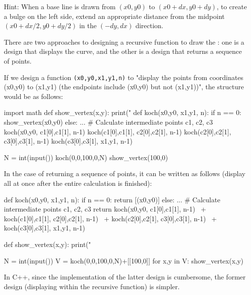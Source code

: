 Hint: When a base line is drawn from $(x0,y0)$ to $(x0+dx,y0+dy)$, to create a bulge on the left side, extend an appropriate distance from the midpoint $(x0+dx/2,y0+dy/2)$ in the $(-dy,dx)$ direction.

There are two approaches to designing a recursive function to draw the : one is a design that displays the curve, and the other is a design that returns a sequence of points.

If we design a function \texttt{(x0,y0,x1,y1,n)} to "display the points from coordinates (x0,y0) to (x1,y1) (the endpoints include (x0,y0) but not (x1,y1))", the structure would be as follows:
\begin{pybox}
import math
def show_vertex(x,y):
    print("
def koch(x0,y0, x1,y1, n):
    if n == 0:
        show_vertex(x0,y0)
    else:
        ... # Calculate intermediate points c1, c2, c3
        koch(x0,y0, c1[0],c1[1], n-1)
        koch(c1[0],c1[1], c2[0],c2[1], n-1)
        koch(c2[0],c2[1], c3[0],c3[1], n-1)
        koch(c3[0],c3[1], x1,y1, n-1)

N = int(input())
koch(0,0,100,0,N)
show_vertex(100,0)
\end{pybox}

In the case of returning a sequence of points, it can be written as follows (display all at once after the entire calculation is finished):
\begin{pybox}
def koch(x0,y0, x1,y1, n):
    if n == 0:
        return [(x0,y0)]
    else:
        ... # Calculate intermediate points c1, c2, c3
        return koch(x0,y0, c1[0],c1[1], n-1) \
            + koch(c1[0],c1[1], c2[0],c2[1], n-1) \
            + koch(c2[0],c2[1], c3[0],c3[1], n-1) \
            + koch(c3[0],c3[1], x1,y1, n-1)

def show_vertex(x,y):
    print("

N = int(input())
V = koch(0,0,100,0,N)+[[100,0]]
for x,y in V:
    show_vertex(x,y)
\end{pybox}

In C++, since the implementation of the latter design is cumbersome, the former design (displaying within the recursive function) is simpler.

